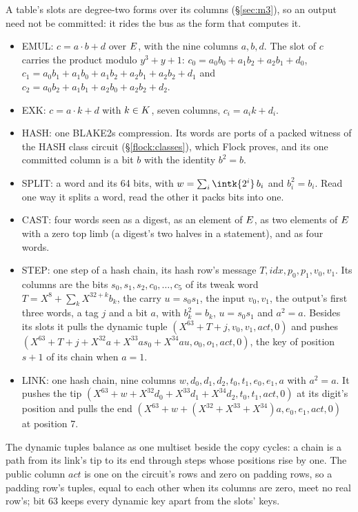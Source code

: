 A table's slots are degree-two forms over its columns (\S\ref{sec:m3}), so an output need not be committed: it rides the bus as the form that computes it.
\begin{itemize}[itemsep=1pt,topsep=3pt]
\item \textsf{EMUL}: $c=a\cdot b+d$ over $E$, with the nine columns $a,b,d$. The slot of $c$ carries the product modulo $y^3+y+1$: $c_0=a_0b_0+a_1b_2+a_2b_1+d_0$, $c_1=a_0b_1+a_1b_0+a_1b_2+a_2b_1+a_2b_2+d_1$ and $c_2=a_0b_2+a_1b_1+a_2b_0+a_2b_2+d_2$.
\item \textsf{EXK}: $c=a\cdot k+d$ with $k\in K$, seven columns, $c_i=a_ik+d_i$.
\item \textsf{HASH}: one BLAKE2s compression. Its words are ports of a packed witness of the \textsf{HASH} class circuit (\S\ref{flock:classes}), which Flock proves, and its one committed column is a bit $b$ with the identity $b^2=b$.
\item \textsf{SPLIT}: a word and its 64 bits, with $w=\sum_i\intk{2^i}\,b_i$ and $b_i^2=b_i$. Read one way it splits a word, read the other it packs bits into one.
\item \textsf{CAST}: four words seen as a digest, as an element of $E$, as two elements of $E$ with a zero top limb (a digest's two halves in a statement), and as four words.
\item \textsf{STEP}: one step of a hash chain, its hash row's message $T,\mathit{idx},p_0,p_1,v_0,v_1$. Its columns are the bits $s_0,s_1,s_2,c_0,\dots,c_5$ of its tweak word $T=X^8+\sum_k X^{32+k}b_k$, the carry $u=s_0s_1$, the input $v_0,v_1$, the output's first three words, a tag $j$ and a bit $a$, with $b_k^2=b_k$, $u=s_0s_1$ and $a^2=a$. Besides its slots it pulls the dynamic tuple $(X^{63}+T+j,v_0,v_1,\mathit{act},0)$ and pushes $(X^{63}+T+j+X^{32}a+X^{33}as_0+X^{34}au,o_0,o_1,\mathit{act},0)$, the key of position $s+1$ of its chain when $a=1$.
\item \textsf{LINK}: one hash chain, nine columns $w,d_0,d_1,d_2,t_0,t_1,e_0,e_1,a$ with $a^2=a$. It pushes the tip $(X^{63}+w+X^{32}d_0+X^{33}d_1+X^{34}d_2,t_0,t_1,\mathit{act},0)$ at its digit's position and pulls the end $(X^{63}+w+(X^{32}+X^{33}+X^{34})a,e_0,e_1,\mathit{act},0)$ at position 7.
\end{itemize}
The dynamic tuples balance as one multiset beside the copy cycles: a chain is a path from its link's tip to its end through steps whose positions rise by one. The public column $\mathit{act}$ is one on the circuit's rows and zero on padding rows, so a padding row's tuples, equal to each other when its columns are zero, meet no real row's; bit 63 keeps every dynamic key apart from the slots' keys.
